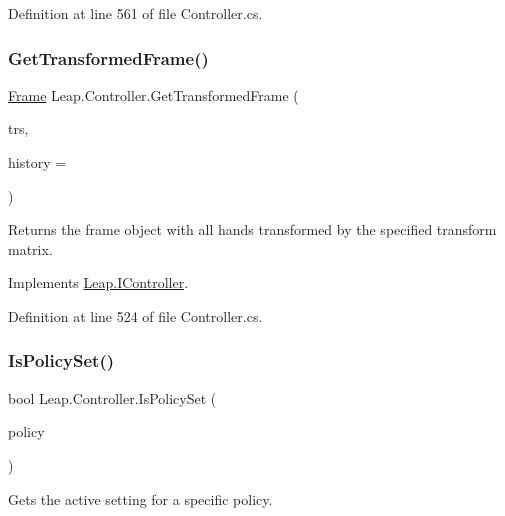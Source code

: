 Definition at line 561 of file Controller.\+cs.

\mbox{\label{class_leap_1_1_controller_ac8b0d112dcaa36505057f7787a0dedda}} 
\subsubsection{\texorpdfstring{GetTransformedFrame()}{GetTransformedFrame()}}
{\footnotesize\ttfamily \mbox{\hyperlink{class_leap_1_1_frame}{Frame}} Leap.\+Controller.\+Get\+Transformed\+Frame (\begin{DoxyParamCaption}\item[{\mbox{\hyperlink{struct_leap_1_1_leap_transform}{Leap\+Transform}}}]{trs,  }\item[{int}]{history = {} }\end{DoxyParamCaption})}



Returns the frame object with all hands transformed by the specified transform matrix. 



Implements \mbox{\hyperlink{interface_leap_1_1_i_controller_a10970bf31bdf9dfd46f0449a1759151d}{Leap.\+I\+Controller}}.



Definition at line 524 of file Controller.\+cs.

\mbox{\label{class_leap_1_1_controller_af0f85f9c36a57143107952afc26ec5d4}} 
\subsubsection{\texorpdfstring{IsPolicySet()}{IsPolicySet()}}
{\footnotesize\ttfamily bool Leap.\+Controller.\+Is\+Policy\+Set (\begin{DoxyParamCaption}\item[{\mbox{\hyperlink{class_leap_1_1_controller_a0bdb49fa94aa2da8b098c1ac296528d6}{Policy\+Flag}}}]{policy }\end{DoxyParamCaption})}



Gets the active setting for a specific policy. 

